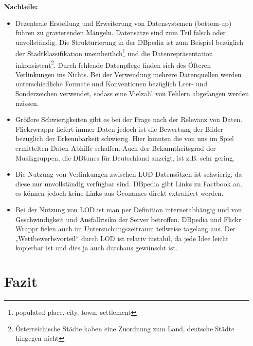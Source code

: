 \documentclass[a4paper, 11pt]{article}
\begin{document}
\textbf{Nachteile:}
\begin{itemize}
\item Dezentrale Erstellung und Erweiterung von Datensystemen (bottom-up) führen zu gravierenden Mängeln. Datensätze sind zum Teil falsch oder unvollständig. Die Strukturierung in der DBpedia ist zum Beispiel bezüglich der Stadtklassifikation uneinheitlich\footnote{populated place, city, town, settlement} und die Datenrepräsentation inkonsistent\footnote{Österreichische Städte haben eine Zuordnung zum Land, deutsche Städte hingegen nicht}. Durch fehlende Datenpflege finden sich des Öfteren Verlinkungen ins Nichts. Bei der Verwendung mehrere Datenquellen werden unterschiedliche Formate und Konventionen bezüglich Leer- und Sonderzeichen verwendet, sodass eine Vielzahl von Fehlern abgefangen werden müssen.
\item Größere Schwierigkeiten gibt es bei der Frage nach der Relevanz von Daten. Flickrwrappr liefert immer Daten jedoch ist die Bewertung der Bilder bezüglich der Erkennbarkeit schwierig. Hier könnten die von uns im Spiel ermittelten Daten Abhilfe schaffen. Auch der Bekanntheitsgrad der Musikgruppen, die DBtunes für Deutschland anzeigt, ist z.B. sehr gering. 
\item Die Nutzung von Verlinkungen zwischen LOD-Datensätzen ist schwierig, da diese nur unvollständig verfügbar sind. DBpedia gibt Links zu Factbook an, es können jedoch keine Links aus Geonames direkt extrahiert werden.   
\item Bei der Nutzung von LOD ist man per Definition internetabhängig und von Geschwindigkeit und Ausfallrisiko der Server betroffen. DBpedia und Flickr Wrappr fielen auch im Untersuchungszeitraum teilweise tagelang aus. Der „Wettbewerbsvorteil“ durch LOD ist relativ instabil, da jede Idee leicht kopierbar ist und dies ja auch durchaus gewünscht ist. 
\end{itemize}
\newpage
\section{Fazit}
\end{document}
